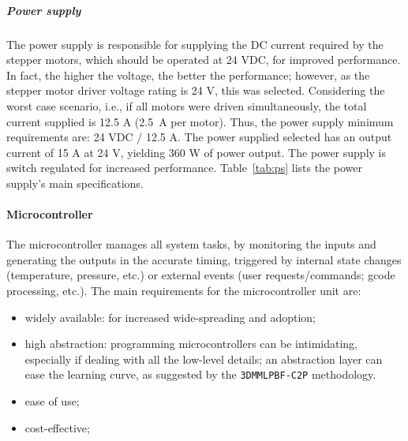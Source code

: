 \subparagraph{Power supply}
The power supply is responsible for supplying the DC current required by the
stepper motors, which should be operated at 24 VDC, for improved performance. In
fact, the higher the voltage, the better the performance; however, as the
stepper motor driver voltage rating is 24 V, this was selected. Considering the worst case scenario, i.e., if all motors were driven simultaneously, the
total current supplied is 12.5 A (2.5~A per motor).  Thus, the power
supply minimum requirements are: 24 VDC / 12.5 A. The power supplied selected
has an output current of 15 A at 24 V, yielding 360 W of power output. %
The power supply is switch regulated for increased
performance. Table~\ref{tab:ps} lists
the power supply's main specifications.
% 

\begin{table}[!hbt]
  \centering
  \caption{Power supply NewStyle 360 W}%
  \label{tab:ps}
\end{table}

\paragraph{Microcontroller}
The microcontroller manages all system tasks, by monitoring the inputs and
generating the outputs in the accurate timing, triggered by internal state
changes (temperature, pressure, etc.) or external events (user
requests/commands; gcode processing, etc.). The main requirements for the
microcontroller unit are:
\begin{itemize}
\item widely available: for increased wide-spreading and adoption;
\item high abstraction: programming microcontrollers can be intimidating,
  especially if dealing with all the low-level details; an abstraction layer can
  ease the learning curve, as suggested by the \texttt{3DMMLPBF-C2P} methodology.
\item ease of use;
\item cost-effective;
\end{itemize}

